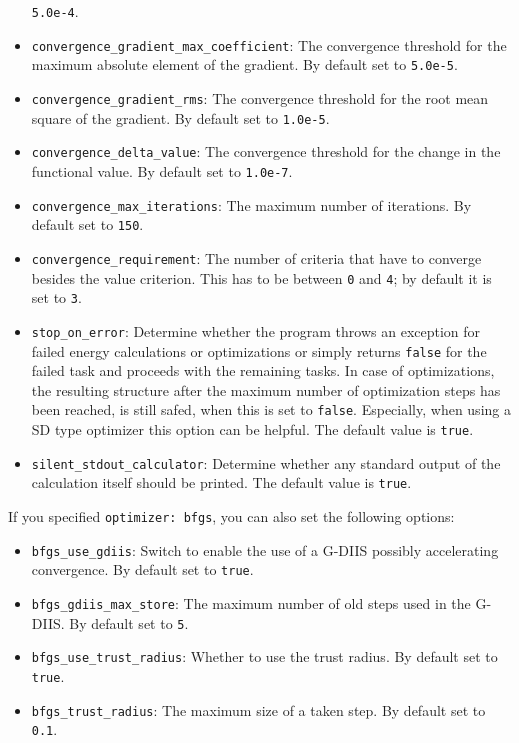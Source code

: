\documentclass[]{tufte-book}
\begin{document}
\begin{itemize}
\texttt{5.0e-4}.
\item \texttt{convergence\_gradient\_max\_coefficient}: The convergence threshold for the maximum absolute element of the gradient.
By default set to \texttt{5.0e-5}.
\item \texttt{convergence\_gradient\_rms}: The convergence threshold for the root mean square of the gradient. By default set to
\texttt{1.0e-5}.
\item \texttt{convergence\_delta\_value}: The convergence threshold for the change in the functional value. By default set to
\texttt{1.0e-7}.
\item \texttt{convergence\_max\_iterations}: The maximum number of iterations. By default set to \texttt{150}.
\item \texttt{convergence\_requirement}: The number of criteria that have to converge besides the value criterion. This
has to be between \texttt{0} and \texttt{4}; by default it is set to \texttt{3}.
\item \texttt{stop\_on\_error}: Determine whether the program throws an exception for failed energy calculations or optimizations or simply returns \texttt{false} for the failed task and proceeds with the remaining tasks. In case of optimizations, the resulting structure after the maximum number of optimization steps has been reached, is still safed, when this is set to \texttt{false}. Especially, when using a SD type optimizer this option can be helpful. The default value is \texttt{true}.
\item \texttt{silent\_stdout\_calculator}: Determine whether any standard output of the calculation itself should be printed. The default value is \texttt{true}.
\end{itemize}

If you specified \texttt{optimizer: bfgs}, you can also set the following options:
\begin{itemize}
\item \texttt{bfgs\_use\_gdiis}: Switch to enable the use of a G-DIIS possibly accelerating convergence. By default set to
\texttt{true}.
\item \texttt{bfgs\_gdiis\_max\_store}: The maximum number of old steps used in the G-DIIS. By default set to \texttt{5}.
\item \texttt{bfgs\_use\_trust\_radius}: Whether to use the trust radius. By default set to \texttt{true}.
\item \texttt{bfgs\_trust\_radius}: The maximum size of a taken step. By default set to \texttt{0.1}.
\end{itemize}
\end{document}
